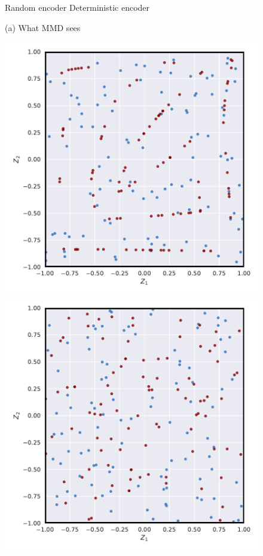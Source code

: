 \documentclass{article}
\begin{document}
\begin{figure}[t!]
	\centering
	\begin{minipage}{.01\textwidth}
		\begin{turn}{90}
			\hspace{1cm} Random encoder \hspace{2.5cm} Deterministic encoder \hspace{1cm}
		\end{turn}       
	\end{minipage}
	\begin{minipage}{.315\textwidth}
		\centering
		(a) What MMD sees
		
		\includegraphics[width=\textwidth]{deterministic_manifold_minibatch}

\includegraphics[width=\textwidth]{random_manifold_minibatch}
		

\end{minipage}
\end{figure}
\end{document}
